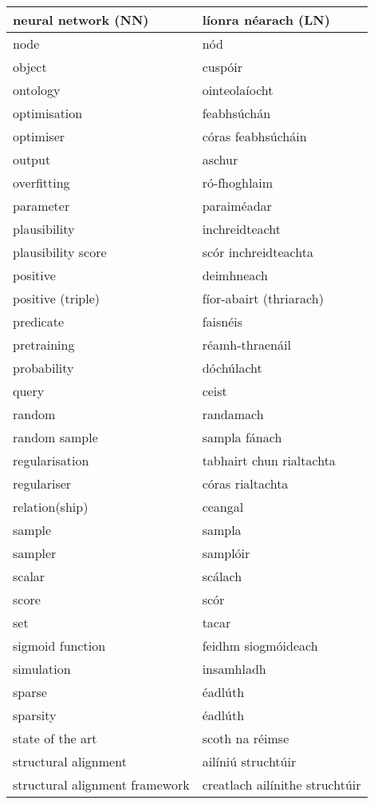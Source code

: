 \documentclass{article}
\begin{document}
\begin{longtable}{|l|l|}
		neural network (NN)&líonra néarach (LN)\\ \hline 
		node&nód\\ \hline 
		object&cuspóir\\ \hline 
		ontology&ointeolaíocht\\ \hline 
		optimisation&feabhsúchán\\ \hline 
		optimiser&córas feabhsúcháin\\ \hline 
		output&aschur\\ \hline 
		overfitting&ró-fhoghlaim\\ \hline 
		parameter&paraiméadar\\ \hline 
		plausibility&inchreidteacht\\ \hline 
		plausibility score&scór inchreidteachta\\ \hline 
		positive&deimhneach\\ \hline 
		positive (triple)&fíor-abairt (thriarach)\\ \hline 
		predicate&faisnéis\\ \hline 
		pretraining&réamh-thraenáil\\ \hline 
		probability&dóchúlacht\\ \hline 
		query&ceist\\ \hline 
		random&randamach\\ \hline 
		random sample&sampla fánach\\ \hline 
		regularisation&tabhairt chun rialtachta\\ \hline 
		regulariser&córas rialtachta\\ \hline 
		relation(ship)&ceangal\\ \hline 
		sample&sampla\\ \hline 
		sampler&samplóir\\ \hline 
		scalar&scálach\\ \hline 
		score&scór\\ \hline 
		set&tacar\\ \hline 
		sigmoid function&feidhm siogmóideach\\ \hline 
		simulation&insamhladh\\ \hline 
		sparse&éadlúth\\ \hline 
		sparsity&éadlúth\\ \hline 
		state of the art&scoth na réimse\\ \hline 
		structural alignment&ailíniú struchtúir\\ \hline 
		structural alignment framework&creatlach ailínithe struchtúir\\ \hline 

\end{longtable}
\end{document}
